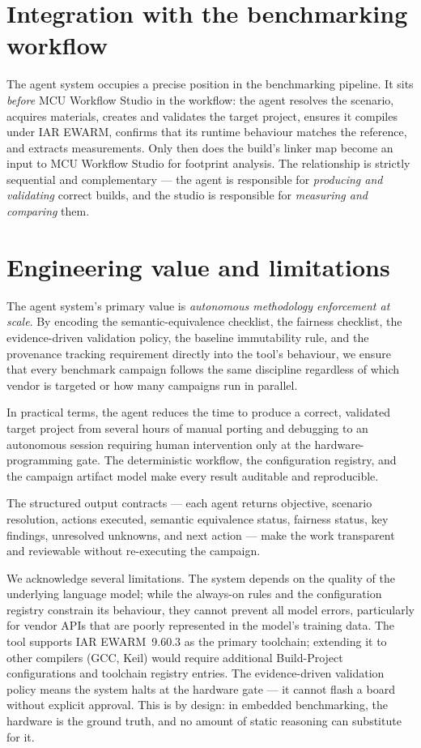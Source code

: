 \section{Integration with the benchmarking workflow}
\label{sec:agent-integration}

The agent system occupies a precise position in the benchmarking pipeline. It sits
\emph{before} MCU Workflow Studio in the workflow: the agent resolves the scenario, acquires
materials, creates and validates the target project, ensures it compiles under IAR EWARM,
confirms that its runtime behaviour matches the reference, and extracts measurements. Only
then does the build's linker map become an input to MCU Workflow Studio for footprint
analysis. The relationship is strictly sequential and complementary --- the agent is
responsible for \emph{producing and validating} correct builds, and the studio is
responsible for \emph{measuring and comparing} them.

\section{Engineering value and limitations}
\label{sec:agent-value}

The agent system's primary value is \emph{autonomous methodology enforcement at scale}. By
encoding the semantic-equivalence checklist, the fairness checklist, the evidence-driven
validation policy, the baseline immutability rule, and the provenance tracking requirement
directly into the tool's behaviour, we ensure that every benchmark campaign follows the
same discipline regardless of which vendor is targeted or how many campaigns run in
parallel.

In practical terms, the agent reduces the time to produce a correct, validated target
project from several hours of manual porting and debugging to an autonomous session
requiring human intervention only at the hardware-programming gate. The deterministic
workflow, the configuration registry, and the campaign artifact model make every result
auditable and reproducible.

The structured output contracts --- each agent returns objective, scenario resolution,
actions executed, semantic equivalence status, fairness status, key findings, unresolved
unknowns, and next action --- make the work transparent and reviewable without re-executing
the campaign.

We acknowledge several limitations. The system depends on the quality of the underlying
language model; while the always-on rules and the configuration registry constrain its
behaviour, they cannot prevent all model errors, particularly for vendor APIs that are
poorly represented in the model's training data. The tool supports IAR EWARM~9.60.3 as the
primary toolchain; extending it to other compilers (GCC, Keil) would require additional
Build-Project configurations and toolchain registry entries. The evidence-driven validation
policy means the system halts at the hardware gate --- it cannot flash a board without
explicit approval. This is by design: in embedded benchmarking, the hardware is the ground
truth, and no amount of static reasoning can substitute for it.

